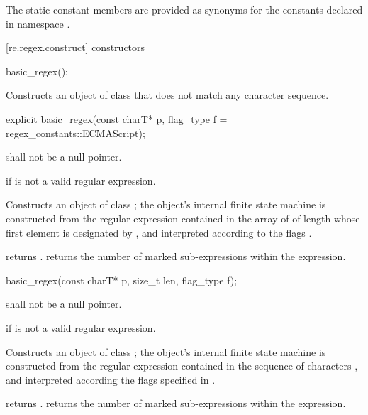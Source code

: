 \pnum
{}%
The static constant members are provided as synonyms for the constants
declared in namespace .

[re.regex.construct]{ constructors}

%
\begin{itemdecl}
basic_regex();
\end{itemdecl}

\begin{itemdescr}
\pnum
\effects  Constructs an object of class  that
does not match any character sequence.
\end{itemdescr}

%
\begin{itemdecl}
explicit basic_regex(const charT* p, flag_type f = regex_constants::ECMAScript);
\end{itemdecl}

\begin{itemdescr}
\pnum
\requires  {} shall not be a null pointer.

\pnum
\throws  {} if  is not a valid regular expression.

\pnum
\effects  Constructs an object of class ; the object's
internal finite state machine is constructed from the regular
expression contained in the array of  of length
 whose first element is
designated by , and interpreted according to the flags .

\pnum\postconditions
{} returns . 
 returns the number of marked sub-expressions
within the expression.
\end{itemdescr}

%
\begin{itemdecl}
basic_regex(const charT* p, size_t len, flag_type f);
\end{itemdecl}

\begin{itemdescr}
\pnum
\requires  {} shall not be a null pointer.

\pnum
\throws  {} if  is not a valid regular expression.

\pnum
\effects  Constructs an object of class ; the object's
internal finite state machine is constructed from the regular
expression contained in the sequence of characters , and
interpreted according the flags specified in .

\pnum\postconditions
{} returns . 
 returns the number of marked sub-expressions
within the expression.
\end{itemdescr}

